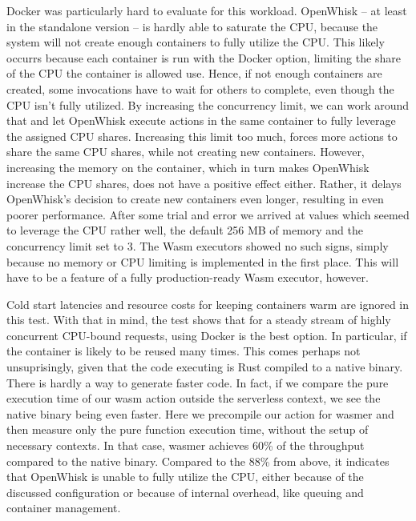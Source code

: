 Docker was particularly hard to evaluate for this workload. OpenWhisk -- at least in the standalone version -- is hardly able to saturate the CPU, because the system will not create enough containers to fully utilize the CPU.
This likely occurrs because each container is run with the  Docker option, limiting the share of the CPU the container is allowed use. Hence, if not enough containers are created, some invocations have to wait for others to complete, even though the CPU isn't fully utilized.
By increasing the concurrency limit, we can work around that and let OpenWhisk execute actions in the same container to fully leverage the assigned CPU shares. Increasing this limit too much, forces more actions to share the same CPU shares, while not creating new containers.
However, increasing the memory on the container, which in turn makes OpenWhisk increase the CPU shares, does not have a positive effect either. Rather, it delays OpenWhisk's decision to create new containers even longer, resulting in even poorer performance. After some trial and error we arrived at values which seemed to leverage the CPU rather well, the default 256 MB of memory and the concurrency limit set to 3.
The Wasm executors showed no such signs, simply because no memory or CPU limiting is implemented in the first place. This will have to be a feature of a fully production-ready Wasm executor, however.

Cold start latencies and resource costs for keeping containers warm are ignored in this test. With that in mind, the test shows that for a steady stream of highly concurrent CPU-bound requests, using Docker is the best option. In particular, if the container is likely to be reused many times. This comes perhaps not unsuprisingly, given that the code executing is Rust compiled to a native  binary. There is hardly a way to generate faster code. In fact, if we compare the pure execution time of our wasm action outside the serverless context, we see the native binary being even faster. Here we precompile our action for wasmer and then measure only the pure function execution time, without the setup of necessary contexts. In that case, wasmer achieves 60\% of the throughput compared to the native binary. Compared to the 88\% from above, it indicates that OpenWhisk is unable to fully utilize the CPU, either because of the discussed configuration or because of internal overhead, like queuing and container management. 
